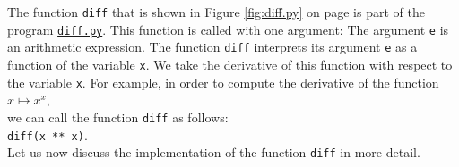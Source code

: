 \noindent
The function \texttt{diff} that is shown in Figure \ref{fig:diff.py} on page \pageref{fig:diff.py} is part
of the program
\href{https://github.com/karlstroetmann/Logik/blob/master/Python/diff.py}{\texttt{diff.py}}.
This function is called with one argument:
The argument \texttt{e} is an arithmetic expression.
The function \texttt{diff} interprets its argument \texttt{e} as a function of the variable
\texttt{x}.  We take the \href{https://en.wikipedia.org/wiki/Derivative}{derivative} of this
function with respect to the variable \texttt{x}.  For example, in order to compute the derivative of
the function
\\[0.2cm]
\hspace*{1.3cm}
$x \mapsto x^x$,
\\[0.2cm]
we can call the function  \texttt{diff} as follows:
\\[0.2cm]
\hspace*{1.3cm}
\texttt{diff(x ** x)}.
\\[0.2cm]
Let us now discuss the implementation of the function \texttt{diff} in more detail.  
